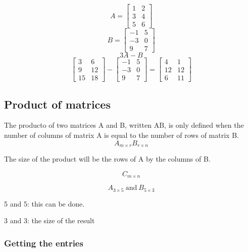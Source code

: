 \begin{example}[]
	\[A = \begin{bmatrix}  1 & 2 \\ 3 & 4 \\ 5 & 6 \end{bmatrix} \]
	\[ B = \begin{bmatrix} -1 & 5 \\ -3 & 0 \\ 9 & 7 \end{bmatrix} \]
	\[3A-B\]
	\[   \begin{bmatrix} 3 & 6 \\ 9 & 12 \\ 15 & 18 \end{bmatrix} - \begin{bmatrix} -1 & 5 \\ -3 & 0 \\ 9 & 7 \end{bmatrix}  = \begin{bmatrix} 4 & 1 \\ 12 & 12 \\ 6 & 11 \end{bmatrix}     \]
\end{example}


\subsection{Product of matrices}%
\label{sub:product_of_matrices}

\begin{definition}[]
	The producto of two matrices A and B, written AB, is only defined when the number of columns
	of matrix A is equal to the number of rows of matrix B.
	\[A_{m \times r} B_{r\times n}\]

	The size of the product will be the rows of A by the columns of B.

	\[C_{m \times n}\]
\end{definition}

\begin{example}[]
	\[A_{3 \times 5} \:\text{and}\: B_{5\times 3}\]

	5 and 5: this can be done.

	3 and 3: the size of the result
\end{example}

\subsubsection{Getting the entries}%
\label{ssub:getting_the_entries}

